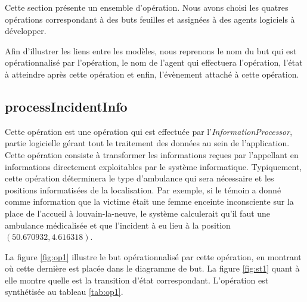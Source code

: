 Cette section présente un ensemble d'opération. Nous avons choisi les quatres
opérations correspondant à des buts feuilles et assignées à des agents logiciels
à développer.

Afin d'illustrer les liens entre les modèles, nous reprenons le nom du but
qui est opérationnalisé par l'opération, le nom de l'agent qui effectuera 
l'opération, l'état à atteindre après cette opération et enfin, l'évènement
attaché à cette opération.

\subsection{processIncidentInfo}

	Cette opération est une opération qui est effectuée par l'\textit{InformationProcessor},
	partie logicielle gérant tout le traitement des données au sein de
	l'application. Cette opération consiste à transformer les informations
	reçues par l'appellant en informations directement exploitables par le
	système informatique. Typiquement, cette opération déterminera 
	le type d'ambulance qui sera nécessaire et les positions \og informatisées \fg
	de la localisation. Par exemple, si le témoin a donné comme information
	que la victime était une femme enceinte inconsciente sur la place de l'accueil
	à louvain-la-neuve, le système calculerait qu'il faut une ambulance
	médicalisée et que l'incident à eu lieu à la position $(50.670932,4.616318)$.
	
	La figure \ref{fig:op1} illustre le but opérationnalisé par cette opération,
	en montrant où cette dernière est placée dans le diagramme de but. La figure
	\ref{fig:st1} quant à elle montre quelle est la transition d'état 
	correspondant. L'opération est synthétisée au tableau \ref{tab:op1}.
	
	
